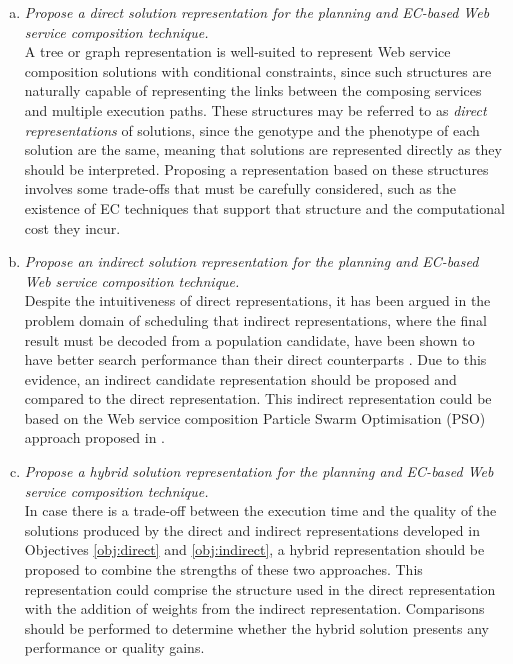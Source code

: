 \begin{enumerate}
  \begin{enumerate}[(a)]
    \item \label{obj:direct} \textit{Propose a direct solution representation for the planning and EC-based Web service composition technique.}\\
    A tree or graph representation is well-suited to represent Web service composition solutions with conditional constraints, since such structures are naturally capable of representing the links between the composing services and multiple execution paths. These structures may be referred to as \textit{direct representations} of solutions, since the genotype and the phenotype of each solution are the same, meaning that solutions are represented directly as they should be interpreted. Proposing a representation based on these structures involves some trade-offs that must be carefully considered, such as the existence of EC techniques that support that structure and the computational cost they incur.
    \item \label{obj:indirect} \textit{Propose an indirect solution representation for the planning and EC-based Web service composition technique.}\\
    Despite the intuitiveness of direct representations, it has been argued in the problem domain of scheduling that indirect representations, where the final result must be decoded from a population candidate, have been shown to have better search performance than their direct counterparts \cite{hart2005evolutionary,craenen2001handle}. Due to this evidence, an indirect candidate representation should be proposed and compared to the direct representation. This indirect representation could be based on the Web service composition Particle Swarm Optimisation (PSO) approach proposed in \cite{da2014graph}.
    \item \label{obj:hybrid} \textit{Propose a hybrid solution representation for the planning and EC-based Web service composition technique.}\\
    In case there is a trade-off between the execution time and the quality of the solutions produced by the direct and indirect representations developed in Objectives \ref{obj:direct} and \ref{obj:indirect}, a hybrid representation should be proposed to combine the strengths of these two approaches. This representation could comprise the structure used in the direct representation with the addition of weights from the indirect representation. Comparisons should be performed to determine whether the hybrid solution presents any performance or quality gains.
  \end{enumerate}
 

\end{enumerate}
